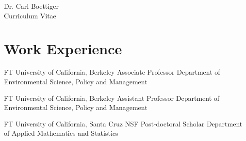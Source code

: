 \documentclass[10pt]{article} %
\begin{document}
\begin{paracol}{2} %


\parbox[top][0.12\textheight][c]{\linewidth}{ %
	\vspace{-0.04\textheight} %
	\centering %
	{\sffamily\Huge Dr. Carl Boettiger}\\\medskip %
	{\Huge\color{headings}\cvtextfont Curriculum Vitae}
}




\section{Work Experience}




{FT} %
{University of California, Berkeley} %
{Associate Professor} %
{Department of Environmental Science, Policy and Management} %


{FT} %
{University of California, Berkeley} %
{Assistant Professor} %
{Department of Environmental Science, Policy and Management} %


{FT} %
{University of California, Santa Cruz} %
{NSF Post-doctoral Scholar} %
{Department of Applied Mathematics and Statistics}  %


\end{paracol}
\end{document}
